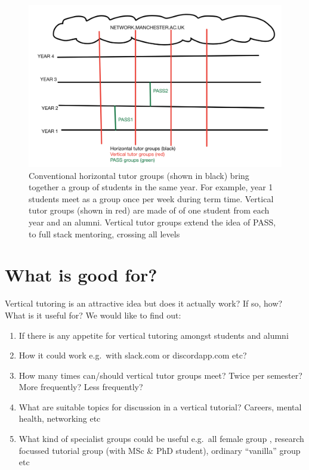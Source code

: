 \documentclass[12pt,]{book}
\providecommand{\tightlist}{%
  \setlength{\itemsep}{0pt}\setlength{\parskip}{0pt}}
\begin{document}
\begin{figure}

{\centering \includegraphics[width=1\linewidth]{images/vertical-tutor-groups} 

}

\caption{Conventional horizontal tutor groups (shown in black) bring together a group of students in the same year. For example, year 1 students meet as a group once per week during term time. Vertical tutor groups (shown in red) are made of of one student from each year and an alumni. Vertical tutor groups extend the idea of PASS, to full stack mentoring, crossing all levels}\label{fig:unnamed-chunk-5}
\end{figure}

\hypertarget{what-is-good-for}{%
\section{What is good for?}\label{what-is-good-for}}

Vertical tutoring is an attractive idea but does it actually work? If so, how? What is it useful for? We would like to find out:

\begin{enumerate}
\def\labelenumi{\arabic{enumi}.}
\tightlist
\item
  If there is any appetite for vertical tutoring amongst students and alumni
\item
  How it could work e.g.~with slack.com or discordapp.com etc?
\item
  How many times can/should vertical tutor groups meet? Twice per semester? More frequently? Less frequently?
\item
  What are suitable topics for discussion in a vertical tutorial? Careers, mental health, networking etc
\item
  What kind of specialist groups could be useful e.g.~all female group , research focussed tutorial group (with MSc \& PhD student), ordinary ``vanilla'' group etc
\end{enumerate}
\end{document}
